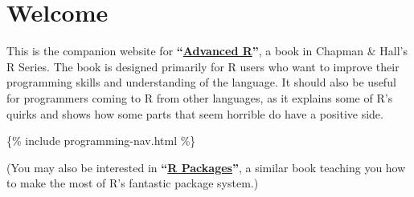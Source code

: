 \hypertarget{welcome}{%
\chapter{Welcome}\label{welcome}}

This is the companion website for
\textbf{``\href{http://amzn.com/1466586966?tag=devtools-20}{Advanced
R}''}, a book in Chapman \& Hall's R Series. The book is designed
primarily for R users who want to improve their programming skills and
understanding of the language. It should also be useful for programmers
coming to R from other languages, as it explains some of R's quirks and
shows how some parts that seem horrible do have a positive side.

\{\% include programming-nav.html \%\}

(You may also be interested in
\textbf{``\href{http://r-pkgs.had.co.nz/}{R Packages}''}, a similar book
teaching you how to make the most of R's fantastic package system.)
